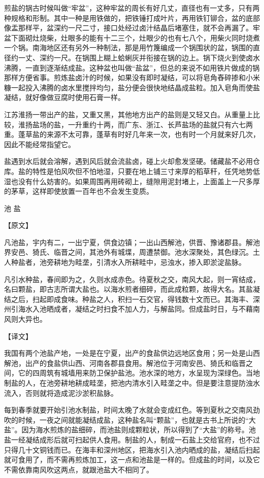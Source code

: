 \documentclass[12pt,UTF8]{ctexbook}
\begin{document}
煎盐的锅古时候叫做“牢盆”，这种牢盆的周长有好几丈，直径也有一丈多，只有两种规格和形制。其中一种是用铁做的，把铁锤打成叶片，再用铁钉铆合，盆的底部像盂那样平，盆深约一尺二寸，接口处经过卤汁结晶后堵塞住，就不会再漏了。牢盆下面砌灶烧柴，灶眼多的能有十二三个，灶眼少的也有七八个，用柴火同时烧煮一个锅。南海地区还有另外一种制法，那是用竹篾编成一个锅围状的盆，锅围的直径约一丈、深约一尺。在锅围上糊上蛤蜊灰并衔接在锅的边上。锅下烧火到使卤水沸腾，一直到逐渐结成盐。这种盆也叫做“盐盆”，但总的来说不如用铁片做成的锅那样方便省事。煎炼盐卤汁的时候，如果没有即时凝结，可以将皂角舂碎掺和小米糠一起投入沸腾的卤水里搅拌均匀，盐分便会很快地结晶成盐粒。加入皂角而使盐凝结，就好像做豆腐时使用石膏一样。

江苏淮扬一带出产的盐，又重又黑，其他地方出产的盐则是又轻又白。从重量上比较，淮扬盐场的盐，一升重约十两，而广东、浙江、长芦盐场的盐就只有六七两重。蓬草盐的来源不太可靠，蓬草有时好几年来一次，也有时一个月就来好几次，因此不能经常指望它。

盐遇到水后就会溶解，遇到风后就会流盐卤，碰上火却愈发坚硬。储藏盐不必用仓库。盐的特性是怕风吹但不怕地湿，只要在地上铺三寸来厚的稻草秆，任凭地势低湿也没有什么妨害的。如果周围再用砖砌上，缝隙用泥封堵上，上面盖上一尺多厚的茅草，这样即使放置一百年也不会发生变质。

池 盐

【原文】

凡池盐，宇内有二，一出宁夏，供食边镇；一出山西解池，供晋、豫诸郡县。解池界安邑、猗氏、临晋之间，其池外有城堞，周遭禁御。池水深聚处，其色绿沉。土人种盐者，池旁耕地为畦垄，引清水入所耕畦中，忌浊水，掺入即淤淀盐脉。

凡引水种盐，春间即为之，久则水成赤色。待夏秋之交，南风大起，则一宵结成，名曰颗盐，即古志所谓大盐也。以海水煎者细碎，而此成粒颗，故得大名。其盐凝结之后，扫起即成食味。种盐之人，积扫一石交官，得钱数十文而已。其海丰、深州引海水入池晒成者，凝结之时扫食不加人力，与解盐同。但成盐时日，与不藉南风则大异也。

【译文】

我国有两个池盐产地，一处是在宁夏，出产的食盐供边远地区食用；另一处是山西解池，出产的食盐供山西、河南各郡县食用。解池位于河南安邑、猗氏和临晋之间，它的四周筑有城墙用来防卫保护盐池。池水深的地方，水呈现为深绿色。当地制盐的人，在池旁耕地耕成畦垄，把池内清水引入畦垄之中。但是要注意提防浊水流入，否则就将造成泥沙淤积盐脉。

每到春季就要开始引池水制盐，时间太晚了水就会变成红色。等到夏秋之交南风劲吹的时候，一夜之间就能凝结成盐，这种盐名叫“颗盐”，也就是古书上所说的“大盐”。因为海水煎炼的盐细碎，而池盐则成颗粒状，所以得到了“大盐”的称号。池盐一经凝结成形后就可扫起供人食用。制盐的人，制成一石盐上交给官府，也不过只得几十文铜钱而已。在海丰和深州地区，把海水引入池内晒成的盐，凝结后扫起就可食用了，而不需再煎炼加工，这一点和池盐是一样的。但成盐的时间，以及它不需依靠南风吹这两点，就跟池盐大不相同了。
\end{document}
